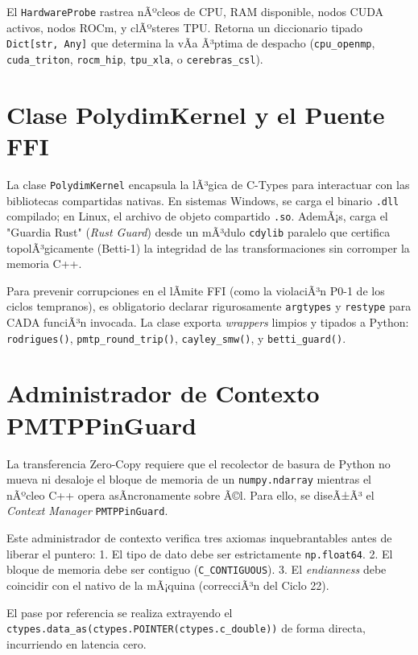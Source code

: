 El \texttt{HardwareProbe} rastrea nÃºcleos de CPU, RAM disponible, nodos CUDA activos, nodos ROCm, y clÃºsteres TPU. Retorna un diccionario tipado \texttt{Dict[str, Any]} que determina la vÃ­a Ã³ptima de despacho (\texttt{cpu\_openmp}, \texttt{cuda\_triton}, \texttt{rocm\_hip}, \texttt{tpu\_xla}, o \texttt{cerebras\_csl}).

\section{Clase PolydimKernel y el Puente FFI}


La clase \texttt{PolydimKernel} encapsula la lÃ³gica de C-Types para interactuar con las bibliotecas compartidas nativas. 
En sistemas Windows, se carga el binario \texttt{.dll} compilado; en Linux, el archivo de objeto compartido \texttt{.so}. AdemÃ¡s, carga el "Guardia Rust" (\textit{Rust Guard}) desde un mÃ³dulo \texttt{cdylib} paralelo que certifica topolÃ³gicamente (Betti-1) la integridad de las transformaciones sin corromper la memoria C++.

Para prevenir corrupciones en el lÃ­mite FFI (como la violaciÃ³n P0-1 de los ciclos tempranos), es obligatorio declarar rigurosamente \texttt{argtypes} y \texttt{restype} para CADA funciÃ³n invocada. La clase exporta \textit{wrappers} limpios y tipados a Python: \texttt{rodrigues()}, \texttt{pmtp\_round\_trip()}, \texttt{cayley\_smw()}, y \texttt{betti\_guard()}.

\section{Administrador de Contexto PMTPPinGuard}


La transferencia Zero-Copy requiere que el recolector de basura de Python no mueva ni desaloje el bloque de memoria de un \texttt{numpy.ndarray} mientras el nÃºcleo C++ opera asÃ­ncronamente sobre Ã©l. Para ello, se diseÃ±Ã³ el \textit{Context Manager} \texttt{PMTPPinGuard}.

Este administrador de contexto verifica tres axiomas inquebrantables antes de liberar el puntero:
1. El tipo de dato debe ser estrictamente \texttt{np.float64}.
2. El bloque de memoria debe ser contiguo (\texttt{C\_CONTIGUOUS}).
3. El \textit{endianness} debe coincidir con el nativo de la mÃ¡quina (correcciÃ³n del Ciclo 22).

El pase por referencia se realiza extrayendo el \texttt{ctypes.data\_as(ctypes.POINTER(ctypes.c\_double))} de forma directa, incurriendo en latencia cero.

